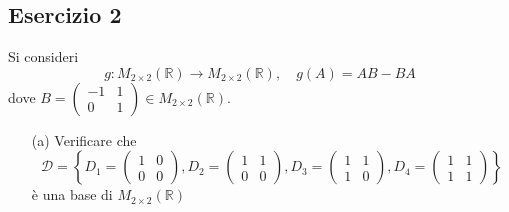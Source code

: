 \documentclass[a4paper]{article}
\theoremstyle{break}
\theoremstyle{break}
\theoremstyle{break}
\theoremstyle{break}
\begin{document}
\subsection{Esercizio 2}
Si consideri
\[
	g: M_{2 \times 2}(\mathbb{R}) \to M_{2 \times 2}(\mathbb{R}), \quad g(A) = AB - BA
\]
dove \( B = \begin{pmatrix}
	-1 & 1 \\
	0  & 1
\end{pmatrix} \in M_{2 \times 2}(\mathbb{R}) \).

\begin{enumerate}
	\item[(a)] Verificare che
	      \[
		      \mathcal{D} = \left\{
		      D_1 = \begin{pmatrix}
			      1 & 0 \\
			      0 & 0
		      \end{pmatrix} ,
		      D_2 = \begin{pmatrix}
			      1 & 1 \\
			      0 & 0
		      \end{pmatrix} ,
		      D_3 = \begin{pmatrix}
			      1 & 1 \\
			      1 & 0
		      \end{pmatrix} ,
		      D_4 = \begin{pmatrix}
			      1 & 1 \\
			      1 & 1
		      \end{pmatrix}
		      \right\}
	      \]
	      è una base di \( M_{2 \times 2}(\mathbb{R}) \)


\end{enumerate}
\end{document}
